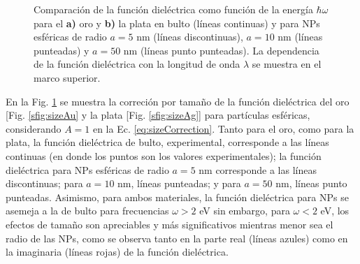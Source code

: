 \begin{figure}[h!]
\begin{subfigure}{.7\linewidth}
	\end{subfigure}\vspace*{-.7em}
	\caption{ Comparación de la función dieléctrica como función de la energía $\hbar\omega$ para el \textbf{a)}  oro y \textbf{b)} la plata en bulto (líneas continuas) y para NPs esféricas de radio $a=5$ nm (líneas discontinuas), $a=10$ nm (líneas punteadas) y $a=50$ nm (líneas punto punteadas). La dependencia de la función dieléctrica con la longitud de onda $\lambda$ se muestra en el marco superior.}\label{fig:sizeCorrection}
	\end{figure}	

%
%
%	
%	

En la Fig.  \ref{fig:sizeCorrection} se muestra la correción por tamaño de la función dieléctrica del oro [Fig. \ref{sfig:sizeAu} y la plata [Fig.  \ref{sfig:sizeAg}] para partículas esféricas, considerando $A=1$ en la Ec. \eqref{eq:sizeCorrection}. Tanto para el oro, como para la plata, la función dieléctrica de bulto, experimental, corresponde a las líneas continuas (en donde los puntos son los valores experimentales); la función dieléctrica para NPs esféricas de radio $a=5$ nm corresponde a las líneas discontinuas; para $a=10$ nm, líneas punteadas; y para $a=50$ nm, líneas punto punteadas. Asimismo, para ambos materiales, la función dieléctrica para NPs se asemeja a la de bulto para frecuencias $\omega>2$ eV sin embargo, para $\omega<2$ eV, los efectos de tamaño son apreciables y más significativos mientras menor sea el radio de las NPs, como se observa tanto  en la parte real (líneas azules) como en la imaginaria (líneas rojas) de la función dieléctrica.


